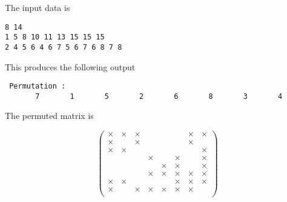 \noindent
{ The input data is}

\def\baselinestretch{0.8}
{\small  \begin{verbatim}
8 14
1 5 8 10 11 13 15 15 15
2 4 5 6 4 6 7 5 6 7 6 8 7 8

\end{verbatim}  }
\medskip

\noindent
{This produces the following output}

\def\baselinestretch{0.8}
{\small { \begin{verbatim}
 Permutation :  
       7       1       5       2       6       8       3       4

\end{verbatim} } }
\medskip

\noindent
{\rm The permuted matrix is}

$$
	\left(\begin{array}{cccccccc}
    \times &  \times   &  \times  &          &          &        &   \times &   \times \\
    \times &           &  \times  &          &          &        &   \times &          \\ 
    \times &  \times   &          &          &          &        &          &   \times \\
           &           &          &   \times &          & \times &          &   \times \\ 
           &           &          &          &  \times  & \times &          &   \times \\ 
           &           &          &   \times &  \times  & \times &   \times &   \times \\ 
    \times &  \times   &          &          &          & \times &   \times &   \times \\ 
    \times &           &  \times  &   \times &  \times  & \times &   \times &          \\ 
	\end{array}\right)
$$

\begin{funders}
\end{funders}

